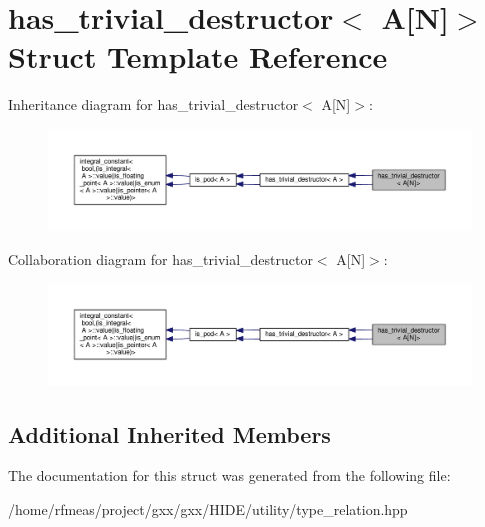 \hypertarget{structhas__trivial__destructor_3_01A[N]_4}{}\section{has\+\_\+trivial\+\_\+destructor$<$ A\mbox{[}N\mbox{]}$>$ Struct Template Reference}
\label{structhas__trivial__destructor_3_01A[N]_4}


Inheritance diagram for has\+\_\+trivial\+\_\+destructor$<$ A\mbox{[}N\mbox{]}$>$\+:
\nopagebreak
\begin{figure}[H]
\begin{center}
\leavevmode
\includegraphics[width=350pt]{structhas__trivial__destructor_3_01A[N]_4__inherit__graph}
\end{center}
\end{figure}


Collaboration diagram for has\+\_\+trivial\+\_\+destructor$<$ A\mbox{[}N\mbox{]}$>$\+:
\nopagebreak
\begin{figure}[H]
\begin{center}
\leavevmode
\includegraphics[width=350pt]{structhas__trivial__destructor_3_01A[N]_4__coll__graph}
\end{center}
\end{figure}
\subsection*{Additional Inherited Members}


The documentation for this struct was generated from the following file\+:\begin{DoxyCompactItemize}
\item 
/home/rfmeas/project/gxx/gxx/\+H\+I\+D\+E/utility/type\+\_\+relation.\+hpp\end{DoxyCompactItemize}
